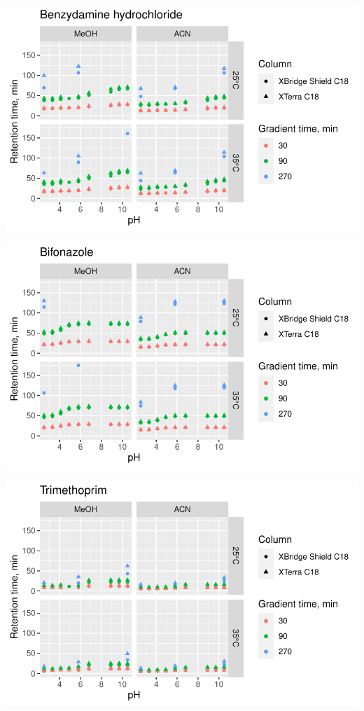 \documentclass[
  letterpaper,
  DIV=11,
  numbers=noendperiod]{scrreprt}
\begin{document}
\includegraphics{index_files/figure-pdf/unnamed-chunk-4-117.pdf}

\includegraphics{index_files/figure-pdf/unnamed-chunk-4-118.pdf}

\includegraphics{index_files/figure-pdf/unnamed-chunk-4-119.pdf}
\end{document}
